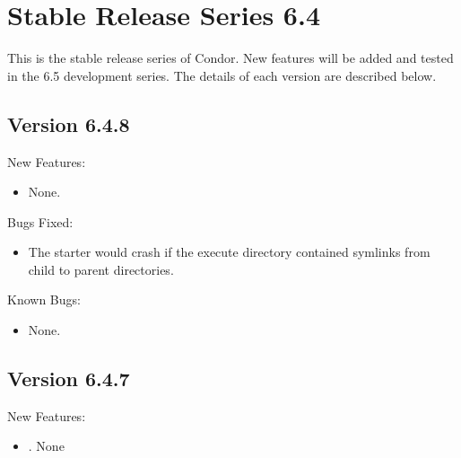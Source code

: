 \section{\label{sec:History-6-4}Stable Release Series 6.4}

This is the stable release series of Condor.
New features will be added and tested in the 6.5 development series. 
The details of each version are described below.

\subsection{\label{sec:New-6-2-0}Version 6.4.8}

\noindent New Features:

\begin{itemize}

\item None.

\end{itemize}

\noindent Bugs Fixed:

\begin{itemize}

\item The starter would crash if the execute directory contained
symlinks from child to parent directories.

\end{itemize}

\noindent Known Bugs:

\begin{itemize}

\item None.

\end{itemize}

\subsection{\label{sec:New-6-4-7}Version 6.4.7}
\noindent New Features:
\begin{itemize}

\item. None

\end{itemize}

